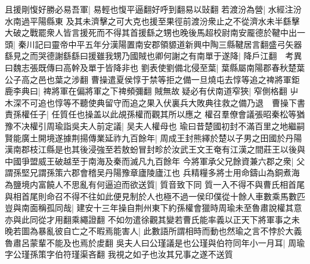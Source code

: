 且援剛愎好勝必易吾軍|{
	易輕也愎平逼翻好呼到翻易以䜴翻}
若渡汾為營|{
	水經注汾水南過平陽縣東}
及其未濟擊之可大克也援至果徑前渡汾衆止之不從濟水未半繇擊大破之戰罷衆人皆言援死而不得其首援繇之甥也晚後馬超校尉南安龎德於鞬中出一頭|{
	秦川記曰靈帝中平五年分漢陽置南安郡領䝠道新興中陶三縣鞬居言翻盛弓矢器}
繇見之而哭德謝繇繇曰援雖我甥乃國賊也卿何謝之有南單于遂降|{
	降戶江翻　考異曰魏志張既傳曰高幹及單于皆降非也}
劉表使劉備北侵至葉|{
	葉縣屬南陽郡春秋楚葉公子高之邑也葉之涉翻}
曹操遣夏侯惇于禁等拒之備一旦燒屯去惇等追之禆將軍鉅鹿李典曰|{
	禆將軍在偏將軍之下禆頻彌翻}
賊無故疑必有伏南道窄狹|{
	窄側格翻}
屮木深不可追也惇等不聽使典留守而追之果入伏裏兵大敗典往救之備乃退　曹操下書責孫權任子|{
	任質任也操盖以此覘孫權而觀其所以應之}
權召羣僚會議張昭秦松等猶豫不决權引周瑜詣吳夫人前定議|{
	吴夫人權母也}
瑜曰昔楚國初封不滿百里之地繼嗣賢能廣土開境遂據荆揚傳業延祚九百餘年|{
	周成王封熊繹於楚以子男之田國於丹陽漢南郡枝江縣是也其後浸強至若敖蚡冒封畛於汝武王文王奄有江漢之間莊王以後與中國爭盟威王破越至于南海及秦而滅凡九百餘年}
今將軍承父兄餘資兼六郡之衆|{
	父謂孫堅兄謂孫策六郡會稽吴丹陽豫章廬陵廬江也}
兵精糧多將士用命鑄山為銅煮海為鹽境内富饒人不思亂有何逼迫而欲送質|{
	質音致下同}
質一入不得不與曹氏相首尾與相首尾則命召不得不往如此便見制於人也極不過一侯印僕從十餘人車數乘馬數匹豈與南面稱孤同哉|{
	建安十三年操自荆州東下約孫權會獵時周瑜未至魯肅說權其意亦與此同從才用翻乘繩證翻}
不如勿遣徐觀其變若曹氏能率義以正天下將軍事之未晚若圖為暴亂彼自亡之不暇焉能害人|{
	此數語所謂相時而動也然瑜之言不悖於大義魯肅呂蒙輩不能及也焉於䖍翻}
吳夫人曰公瑾議是也公瑾與伯符同年小一月耳|{
	周瑜字公瑾孫策字伯符瑾渠吝翻}
我視之如子也汝其兄事之遂不送質

